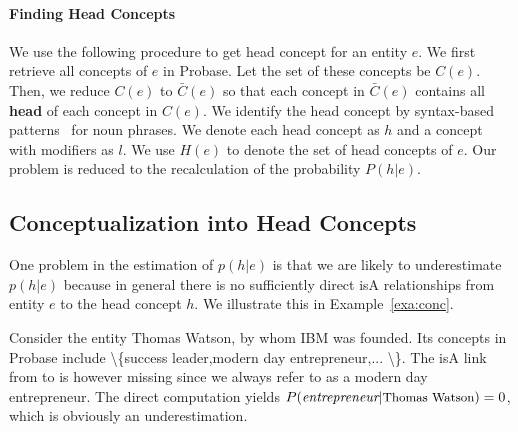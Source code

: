 \paragraph*{Finding Head Concepts}
We use the following procedure to get head concept for an entity $e$.
We first retrieve all concepts of $e$ in Probase. Let the set of these concepts be $C(e)$.
Then, we reduce $C(e)$ to $\bar{C}(e)$ so that each concept in $\bar{C}(e)$ contains all {\bf head} of each concept in $C(e)$.
We identify the head concept by syntax-based patterns~\cite{ponzetto2007deriving} for noun phrases.
We denote each head concept as $h$ and a concept with modifiers as ${l}$.
We use $H(e)$ to denote the set of head concepts of $e$.
Our problem is reduced to the recalculation of the probability $P({h}|e)$.




\subsection{Conceptualization into Head Concepts}
One problem in the estimation of $p(h|e)$ is that we are likely to underestimate $p(h|e)$ because in general there is no sufficiently direct isA relationships from entity $e$ to the head concept $h$.
We illustrate this in Example~\ref{exa:conc}.


\begin{example}[Underestimation]
\label{exa:conc}
Consider the entity \ac{Thomas Watson}, by whom \ac{IBM} was founded. Its concepts in Probase include \ac{\{success leader,modern day entrepreneur,... \}}. The isA link from  to  is however missing since we always refer to  as a modern day entrepreneur. The direct computation yields $P(\ac{entrepreneur}|\at{\text{Thomas Watson}})=0$, which is obviously an underestimation.
\end{example}




